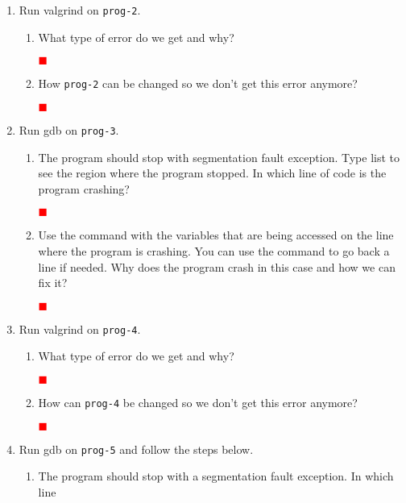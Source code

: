 \documentclass[12pt]{article}
\newenvironment{solution}{\par\textcolor{green!50!black}\bgroup}{\egroup\par}
\newcommand{\TODO}{\textcolor{red}{$\blacksquare$}}
\begin{document}
\begin{enumerate}
\item Run valgrind on \texttt{prog-2}.
\begin{enumerate}
\item What type of error do we get and why?
  \begin{solution}
  \textbf{\textcolor{red}{\TODO}}
  \end{solution}
\item How \texttt{prog-2} can be changed so we don't get this error anymore?
  \begin{solution}
  \textbf{\textcolor{red}{\TODO}}
  \end{solution}
\end{enumerate}
\item Run gdb on \texttt{prog-3}.
\begin{enumerate}
\item The program should stop with segmentation fault exception. Type list to
  see the region where the program stopped. In which line of code is the program
  crashing?
  \begin{solution}
  \textbf{\textcolor{red}{\TODO}}
  \end{solution}
\item Use the command  with the variables that are being
  accessed on the line where the program is crashing. You can use the 
  command to go back a line if needed. Why does the program crash in this case
  and how we can fix it?
  \begin{solution}
  \textbf{\textcolor{red}{\TODO}}
  \end{solution}
\end{enumerate}
\item Run valgrind on \texttt{prog-4}.
  \begin{enumerate}
  \item What type of error do we get and why?
    \begin{solution}
  \textbf{\textcolor{red}{\TODO}}
    \end{solution}
  \item How can \texttt{prog-4} be changed so we don't get this error anymore?
    \begin{solution}
  \textbf{\textcolor{red}{\TODO}}
    \end{solution}
  \end{enumerate}
\item Run gdb on \texttt{prog-5} and follow the steps below.
  \begin{enumerate}
  \item The program should stop with a segmentation fault exception. In which line

\end{enumerate}
\end{enumerate}
\end{document}
